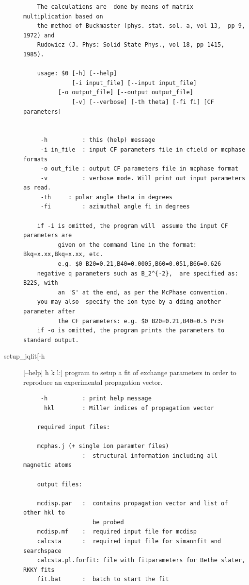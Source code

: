 \begin{description}
\begin{verbatim}
    The calculations are  done by means of matrix  multiplication based on
    the method of Buckmaster (phys. stat. sol. a, vol 13,  pp 9, 1972) and
    Rudowicz (J. Phys: Solid State Phys., vol 18, pp 1415, 1985).   

    usage: $0 [-h] [--help] 
              [-i input_file] [--input input_file]
	      [-o output_file] [--output output_file]
              [-v] [--verbose] [-th theta] [-fi fi] [CF parameters]

          
     -h          : this (help) message
     -i in_file  : input CF parameters file in cfield or mcphase formats
     -o out_file : output CF parameters file in mcphase format
     -v          : verbose mode. Will print out input parameters as read.
     -th	 : polar angle theta in degrees
     -fi         : azimuthal angle fi in degrees

    if -i is omitted, the program will  assume the input CF parameters are
          given on the command line in the format: Bkq=x.xx,Bkq=x.xx, etc.
          e.g. $0 B20=0.21,B40=0.0005,B60=0.051,B66=0.626
    negative q parameters such as B_2^{-2},  are specified as:  B22S, with 
          an 'S' at the end, as per the McPhase convention.
    you may also  specify the ion type by a dding another  parameter after
          the CF parameters: e.g. $0 B20=0.21,B40=0.5 Pr3+
    if -o is omitted, the program prints the parameters to standard output.
  \end{verbatim}
\item[\prg   setup\_jqfit\index{setup\_jqfit}[-h] [--help] h k l:] program to setup a fit of exchange parameters in order to reproduce an experimental propagation vector.
\begin{verbatim}
     -h          : print help message
      hkl        : Miller indices of propagation vector

    required input files:

    mcphas.j (+ single ion paramter files)
                 :  structural information including all magnetic atoms

    output files:

    mcdisp.par   :  contains propagation vector and list of other hkl to
                    be probed
    mcdisp.mf    :  required input file for mcdisp
    calcsta      :  required input file for simannfit and searchspace
    calcsta.pl.forfit: file with fitparameters for Bethe slater, RKKY fits
    fit.bat      :  batch to start the fit

   
\end{verbatim}


\end{description}
